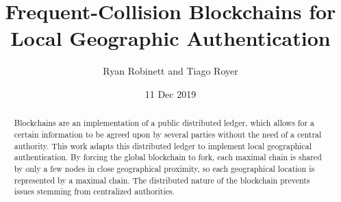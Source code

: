 \documentclass[twocolumn,10pt]{article}
\begin{document}
\title{Frequent-Collision Blockchains for Local Geographic Authentication}
\author{Ryan Robinett and Tiago Royer}
\date{11 Dec 2019}
\maketitle

\begin{abstract}
	Blockchains are an implementation of a public distributed ledger,
	which allows for a certain information to be agreed upon by several parties
	without the need of a central authority.
	This work adapts this distributed ledger
	to implement local geographical authentication.
	By forcing the global blockchain to fork,
	each maximal chain is shared by only a few nodes in close geographical proximity,
	so each geographical location is represented by a maximal chain.
	The distributed nature of the blockchain
	prevents issues stemming from centralized authorities.
\end{abstract}
















\end{document}
